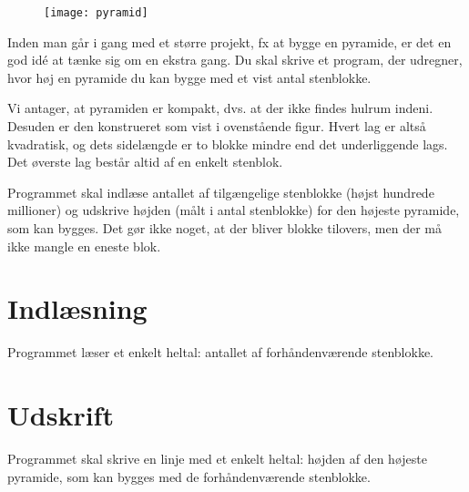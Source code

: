 
\begin{figure}[h!]
  \centering
  \texttt{[image: pyramid]}
\end{figure}

Inden man går i gang med et større projekt, fx at bygge en pyramide, er det en god idé at tænke sig om en ekstra gang.
Du skal skrive et program, der udregner, hvor høj en pyramide du kan bygge med et vist antal stenblokke.

Vi antager, at pyramiden er kompakt, dvs. at der ikke findes hulrum indeni.
Desuden er den konstrueret som vist i ovenstående figur.
Hvert lag er altså kvadratisk, og dets sidelængde er to blokke mindre end det underliggende lags.
Det øverste lag består altid af en enkelt stenblok.

Programmet skal indlæse antallet af tilgængelige stenblokke (højst hundrede millioner) og udskrive højden (målt i antal stenblokke) for den højeste pyramide, som kan bygges.
Det gør ikke noget, at der bliver blokke tilovers, men der må ikke mangle en eneste blok.

\section*{Indlæsning}
Programmet læser et enkelt heltal: antallet af forhåndenværende stenblokke.

\section*{Udskrift}
Programmet skal skrive en linje med et enkelt heltal: højden af den højeste pyramide, som kan bygges med de forhåndenværende stenblokke.
